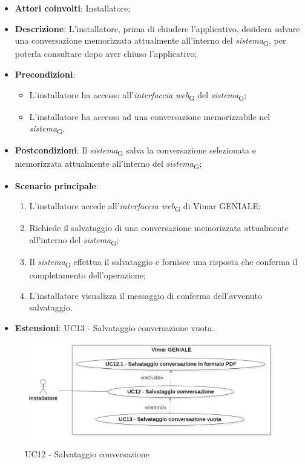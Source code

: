 \begin{itemize}
    \item \textbf{Attori coinvolti}: Installatore;
    \item \textbf{Descrizione}: L’installatore, prima di chiudere l’applicativo, desidera salvare una conversazione memorizzata attualmente all’interno del \textit{sistema}\textsubscript{G}, per poterla consultare dopo aver chiuso l'applicativo;
    \item \textbf{Precondizioni}: 
    \begin{itemize}
        \item L’installatore ha accesso all’\textit{interfaccia web}\textsubscript{G} del \textit{sistema}\textsubscript{G};
        \item L’installatore ha accesso ad una conversazione memorizzabile nel \textit{sistema}\textsubscript{G}.
    \end{itemize}
    \item \textbf{Postcondizioni}: Il \textit{sistema}\textsubscript{G} salva la conversazione selezionata e memorizzata attualmente all’interno del \textit{sistema}\textsubscript{G};
    \item \textbf{Scenario principale}:
    \begin{enumerate}
        \item L’installatore accede all’\textit{interfaccia web}\textsubscript{G} di Vimar GENIALE;
        \item Richiede il salvataggio di una conversazione memorizzata attualmente all'interno del \textit{sistema}\textsubscript{G};
        \item Il \textit{sistema}\textsubscript{G} effettua il salvataggio e fornisce una risposta che conferma il completamento dell’operazione;
        \item L’installatore visualizza il messaggio di conferma dell’avvenuto salvataggio.
    \end{enumerate}
    \item \textbf{Estensioni}: UC13 - Salvataggio conversazione vuota.
\end{itemize}
\begin{figure}[H]
\centering
\includegraphics[width=1\textwidth]{contents/casi_duso/png/UC12.png}
\caption{UC12 - Salvataggio conversazione}
\end{figure}

